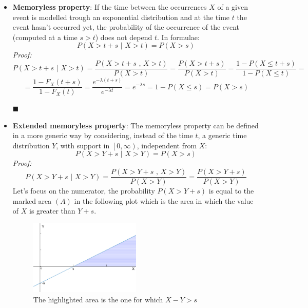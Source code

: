 \documentclass[12pt,a4paper]{article}
\begin{document}
\begin{itemize}
\item \textbf{Memoryless property}: 
If the time between the occurrences $X$ of a given event is modelled trough an exponential distribution and at the time $t$ the event hasn't occurred yet, the probability of the occurrence of the event (computed at a time $s>t$) does not depend $t$. In formulae:
$$
P(X>t+s\hspace{4pt}|\hspace{4pt}X>t)=P(X>s)
$$
\emph{Proof:}
$$
P(X>t+s\hspace{4pt}|\hspace{4pt}X>t) = \frac{P(X>t+s \textrm{ , } X>t)}{P(X>t)} = \frac{P(X>t+s)}{P(X>t)} = 
\frac{1-P(X\leq t+s)}{1-P(X\leq t)} =
$$
$$
= \frac{1-F_X(t+s)}{1-F_X(t)} = \frac{e^{-\lambda (t+s)}}{e^{-\lambda t}} = e^{-\lambda s} =
1-P(X\leq s) = P(X>s)
$$
\begin{flushright}
$\blacksquare$
\end{flushright}
\item \textbf{Extended memoryless property}:
The memoryless property can be defined in a more generic way by considering, instead of the time $t$, a generic time distribution $Y$, with support in $\left[0,\infty \right)$, independent from $X$:
$$
P(X>Y+s\hspace{4pt}|\hspace{4pt}X>Y)=P(X>s)
$$
\newpage
\emph{Proof:}
$$
P(X>Y+s\hspace{4pt}|\hspace{4pt}X>Y) = \frac{P(X>Y+s \textrm{ , } X>Y)}{P(X>Y)} = \frac{P(X>Y+s)}{P(X>Y)} 
$$
Let's focus on the numerator, the probability $P(X>Y+s)$ is equal to the marked area $(A)$ in the following plot which is the area in which the value of $X$ is greater than $Y+s$.
\\\bigskip
\begin{figure}[H]
\begin{center}
\includegraphics[width=0.5\textwidth]{IMG/CommArea.eps}
\caption{\small The highlighted area is the one for which $X-Y>s$}
\label{Picture 1}

\end{center}
\end{figure}
\end{itemize}
\end{document}
